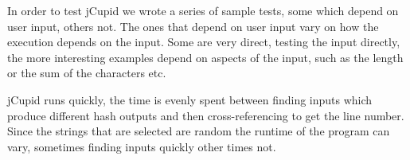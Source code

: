 
In order to test jCupid we wrote a series of sample tests, some which depend on user input, others not. The ones that depend on user input vary on how the execution depends on the input. Some are very direct, testing the input directly, the more interesting examples depend on aspects of the input, such as the length or the sum of the characters etc.

jCupid runs quickly, the time is evenly spent between finding inputs which produce different hash outputs and then cross-referencing to get the line number. Since the strings that are selected are random the runtime of the program can vary, sometimes finding inputs quickly other times not.
